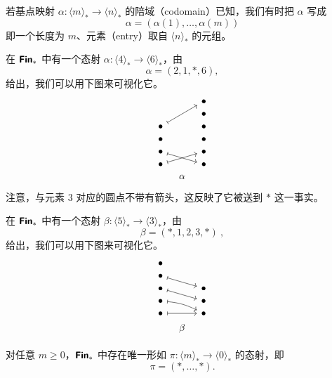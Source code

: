 \begin{notation} 若基点映射 $\alpha:\langle m \rangle_* \to \langle n \rangle_*$ 的陪域（codomain）已知，我们有时把 $\alpha$ 写成
\[
\alpha = (\alpha(1),\dots,\alpha(m))
\]
即一个长度为 $m$、元素（entry）取自 $\langle n \rangle_*$ 的元组。
\end{notation}
\begin{example}\label{morphisminFinexample1}
    在 ${\boldsymbol{\mathsf{Fin}}}_*$ 中有一个态射 $\alpha : \langle 4 \rangle_* \to \langle 6 \rangle_*$，由
    \[
    \alpha = (2,1,*,6),
    \]
    给出，我们可以用下图来可视化它。
    \[ \begin{tikzcd} [row sep = 1, column sep = 8]
          & & \bullet \\
     & & \bullet \\
    \bullet \ar[uurr,mapsto] & & \bullet \\
    \bullet & & \bullet \\
    \bullet  \ar[drr,mapsto] & & \bullet \\
    \bullet\ar[urr,mapsto] & & \bullet \\
    & \alpha & \\
    \end{tikzcd} \]
    注意，与元素 $3$ 对应的圆点不带有箭头，这反映了它被送到 $*$ 这一事实。
\end{example}

\begin{example}\label{morphisminFinexample2}
    在 ${\boldsymbol{\mathsf{Fin}}}_*$ 中有一个态射 $\beta:\langle 5 \rangle_* \to \langle 3 \rangle_*$，由
    \[
    \beta = (*,1,2,3,*)~,
    \]
    给出，我们可以用下图来可视化它。
    \[ \begin{tikzcd} [row sep = 1, column sep = 8]
    \bullet & & \\
    \bullet \ar[drr,mapsto]& & \\
    \bullet \ar[drr,mapsto]& & \bullet\\
    \bullet \ar[drr,bend left = 10, mapsto] & & \bullet\\
    \bullet \ar[rr,mapsto] & & \bullet\\
    & \beta & \\
    \end{tikzcd} \]
\end{example}

\begin{example}\label{morphisminFinexample3}
对任意 $m \geq 0$，${\boldsymbol{\mathsf{Fin}}}_*$ 中存在唯一形如 $\pi:\langle m \rangle_* \to \langle 0 \rangle_*$ 的态射，即
\[
\pi = (*,\dots,*).
\]
\end{example}

